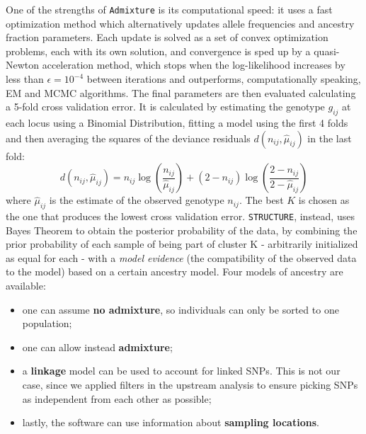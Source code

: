 \documentclass[a4paper, 12pt]{report}
\begin{document}
One of the strengths of \texttt{Admixture} is its computational speed: it uses a fast optimization method which alternatively updates allele frequencies and ancestry fraction parameters. Each update is solved as a set of convex optimization problems, each with its own solution, and convergence is sped up by a quasi-Newton acceleration method, which stops when the log-likelihood increases by less than $\epsilon = 10^{-4}$ between iterations and outperforms, computationally speaking, EM and MCMC algorithms. The final parameters are then evaluated calculating a 5-fold cross validation error. It is calculated by estimating the genotype $g_{ij}$ at each locus using a Binomial Distribution, fitting a model using the first 4 folds and then averaging the squares of the deviance residuals $d(n_{ij}, \hat{\mu}_{ij})$ in the last fold:
\begin{equation}
	d(n_{ij}, \hat{\mu}_{ij}) = 
	n_{ij}\log\!\left(\frac{n_{ij}}{\hat{\mu}_{ij}}\right) +
	(2-n_{ij})\log\!\left(\frac{2-n_{ij}}{2-\hat{\mu}_{ij}}\right)
\end{equation}
where $\hat{\mu}_{ij}$ is the estimate of the observed genotype $n_{ij}$. The best $K$ is chosen as the one that produces the lowest cross validation error. \texttt{STRUCTURE}, instead, uses Bayes Theorem to obtain the posterior probability of the data, by combining the prior probability of each sample of being part of cluster K - arbitrarily initialized as equal for each - with a \textit{model evidence} (the compatibility of the observed data to the model) based on a certain ancestry model. Four models of ancestry are available:
\vspace{-1.5em}
\begin{itemize}\setlength\itemsep{-0.2em}
	\item one can assume \textbf{no admixture}, so individuals can only be sorted to one population;
	\item one can allow instead \textbf{admixture};
	\item a \textbf{linkage} model can be used to account for linked SNPs. This is not our case, since we applied filters in the upstream analysis to ensure picking SNPs as independent from each other as possible;
	\item lastly, the software can use information about \textbf{sampling locations}.
\end{itemize}
\vspace{-1.5em}
\end{document}
